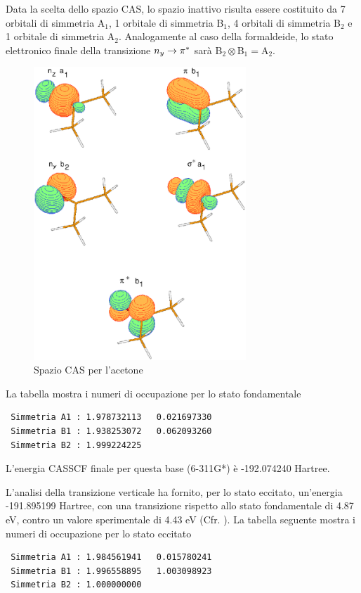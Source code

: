 Data la scelta dello spazio CAS, lo spazio inattivo risulta essere
costituito da 7 orbitali di simmetria A$_1$, 1 orbitale di simmetria B$_1$,
4 orbitali di simmetria B$_2$ e 1 orbitale di simmetria A$_2$. Analogamente
al caso della formaldeide, lo stato elettronico finale della transizione
$n_y \rightarrow \pi^{*}$ sar\`a B$_2 \otimes $B$_1 = $A$_2 $.

\begin{figure}[htb]
\begin{center}
\includegraphics[width=8cm,keepaspectratio]{immagini/acetone/orbitali.eps}
\end{center}
\caption{Spazio CAS per l'acetone}
\label{fig:acetone_orbitali}
\end{figure}

La tabella mostra i numeri di occupazione per lo
stato fondamentale
\begin{verbatim}
 Simmetria A1 : 1.978732113   0.021697330
 Simmetria B1 : 1.938253072   0.062093260 
 Simmetria B2 : 1.999224225
\end{verbatim}

L'energia CASSCF finale per questa base (6-311G*) \`e -192.074240 Hartree.

L'analisi della transizione verticale ha fornito, per lo stato eccitato, un'energia 
-191.895199 Hartree, con una transizione rispetto allo stato fondamentale
di 4.87 eV, contro un valore sperimentale di 4.43 eV (Cfr. \cite{cpl-241-0-1995-26}).
La tabella seguente mostra i numeri di occupazione per lo
stato eccitato
\begin{verbatim}
 Simmetria A1 : 1.984561941   0.015780241 
 Simmetria B1 : 1.996558895   1.003098923
 Simmetria B2 : 1.000000000
\end{verbatim}


